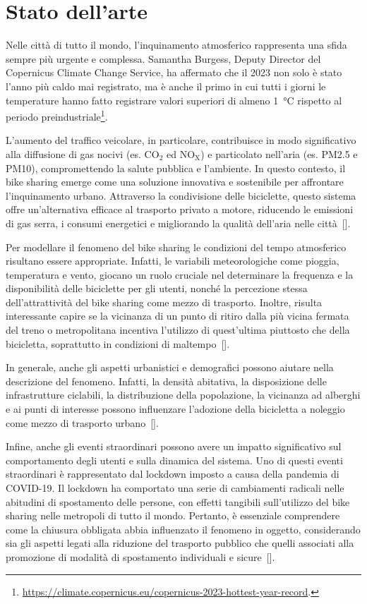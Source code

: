 \section[Stato dell'arte]{Stato dell'arte}
Nelle città di tutto il mondo, l'inquinamento atmosferico rappresenta una sfida sempre più urgente e complessa. Samantha Burgess, Deputy Director del Copernicus Climate Change Service, ha affermato che il 2023 non solo è stato l'anno più caldo mai registrato, ma è anche il primo in cui tutti i giorni le temperature hanno fatto registrare valori superiori di almeno \SI{1}{\degreeCelsius} rispetto al periodo preindustriale\footnote{\url{https://climate.copernicus.eu/copernicus-2023-hottest-year-record}.}.
\par L'aumento del traffico veicolare, in particolare, contribuisce in modo significativo alla diffusione di gas nocivi (es. CO$_2$ ed NO$_\text{X}$) e particolato nell'aria (es. PM\num{2.5} e PM\num{10}), compromettendo la salute pubblica e l'ambiente. In questo contesto, il bike sharing emerge come una soluzione innovativa e sostenibile per affrontare l'inquinamento urbano. Attraverso la condivisione delle biciclette, questo sistema offre un'alternativa efficace al trasporto privato a motore, riducendo le emissioni di gas serra, i consumi energetici e migliorando la qualità dell'aria nelle città~[\cite{paper_bike_sharing_e_ambiente}].
\par Per modellare il fenomeno del bike sharing le condizioni del tempo atmosferico risultano essere appropriate. Infatti, le variabili meteorologiche come pioggia, temperatura e vento, giocano un ruolo cruciale nel determinare la frequenza e la disponibilità delle biciclette per gli utenti, nonché la percezione stessa dell'attrattività del bike sharing come mezzo di trasporto. Inoltre, risulta interessante capire se la vicinanza di un punto di ritiro dalla più vicina fermata del treno o metropolitana incentiva l'utilizzo di quest'ultima piuttosto che della bicicletta, soprattutto in condizioni di maltempo~[\cite{paper_bike_sharing_e_meteo}].
\par In generale, anche gli aspetti urbanistici e demografici possono aiutare nella descrizione del fenomeno. Infatti, la densità abitativa, la disposizione delle infrastrutture ciclabili, la distribuzione della popolazione, la vicinanza ad alberghi e ai punti di interesse possono influenzare l'adozione della bicicletta a noleggio come mezzo di trasporto urbano~[\cite{paper_bike_sharing_e_popolazione}].
\par Infine, anche gli eventi straordinari possono avere un impatto significativo sul comportamento degli utenti e sulla dinamica del sistema. Uno di questi eventi straordinari è rappresentato dal lockdown imposto a causa della pandemia di COVID-\num{19}. Il lockdown ha comportato una serie di cambiamenti radicali nelle abitudini di spostamento delle persone, con effetti tangibili sull'utilizzo del bike sharing nelle metropoli di tutto il mondo. Pertanto, è essenziale comprendere come la chiusura obbligata abbia influenzato il fenomeno in oggetto, considerando sia gli aspetti legati alla riduzione del trasporto pubblico che quelli associati alla promozione di modalità di spostamento individuali e sicure~[\cite{paper_bike_sharing_e_covid}].
